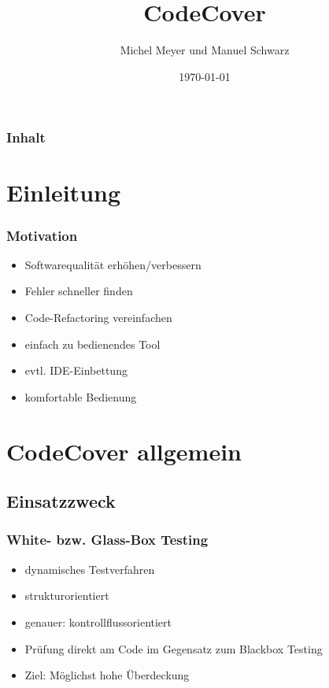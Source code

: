 \documentclass{beamer}
\begin{document}
  \title[CodeCover\hspace{105mm}\insertframenumber/\inserttotalframenumber]{CodeCover}
  \author{Michel Meyer und Manuel Schwarz}
  \date{\today}

  \begin{frame}
    \titlepage
  \end{frame}

  \begin{frame}\frametitle{Inhalt}\tableofcontents
  \end{frame}


  \section{Einleitung}
  \begin{frame}\frametitle{Motivation}
    \begin{itemize}
      \item Softwarequalität erhöhen/verbessern
      \item Fehler schneller finden
      \item Code-Refactoring vereinfachen
      \item einfach zu bedienendes Tool
      \item evtl. IDE-Einbettung
      \item komfortable Bedienung
    \end{itemize}
  \end{frame}


  \section{CodeCover allgemein}
  \subsection{Einsatzzweck}
  \begin{frame}\frametitle{White- bzw. Glass-Box Testing}
    \begin{itemize}
      \item dynamisches Testverfahren
      \item strukturorientiert
      \item genauer: kontrollflussorientiert
      \item Prüfung direkt am Code im Gegensatz zum Blackbox Testing
      \item Ziel: Möglichst hohe Überdeckung
    \end{itemize}
  \end{frame}
\end{document}
